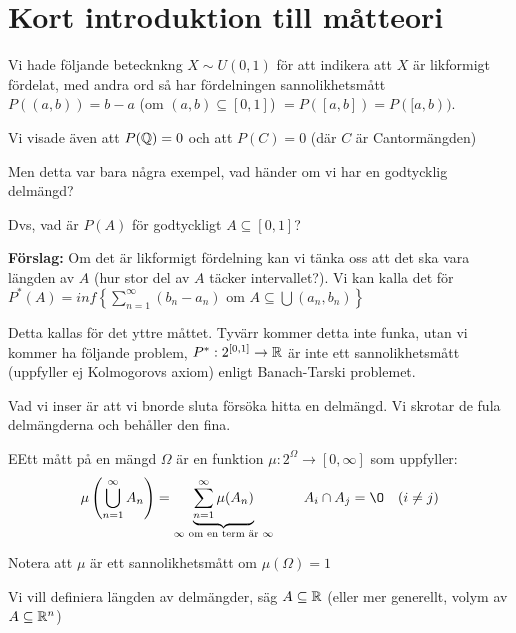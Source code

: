 \section{Kort introduktion till måtteori}\par
\noindent Vi hade följande betecknkng $X\sim U(0,1)$ för att indikera att $X$  är likformigt fördelat, med andra ord så har fördelningen sannolikhetsmått $P((a,b)) = b-a$ (om $(a,b)\subseteq [0,1]$) $= P([a,b]) = P([a,b))$.\par
\noindent Vi visade även att $P(\mathbb{Q})=0$ och att $P(C)=0$ (där $C$ är Cantormängden)
\par\bigskip
\noindent Men detta var bara några exempel, vad händer om vi har en godtycklig delmängd?\par
\noindent Dvs, vad är $P(A)$ för godtyckligt $A\subseteq[0,1]$?
\par\bigskip
\noindent\textbf{Förslag:} Om det är likformigt fördelning kan vi tänka oss att det ska vara längden av $A$ (hur stor del av $A$ täcker intervallet?). Vi kan kalla det för $P^*(A) = inf\left\{\sum_{n=1}^{\infty}(b_n-a_n)\text{ om } A\subseteq\bigcup(a_n,b_n)\right\}$\par
\noindent Detta kallas för det yttre måttet. Tyvärr kommer detta inte funka, utan vi kommer ha följande problem, $P^*:2^{[0,1]}\to\mathbb{R}$ är inte ett sannolikhetsmått (uppfyller ej Kolmogorovs axiom) enligt Banach-Tarski problemet.
\par\bigskip
\noindent Vad vi inser är att vi bnorde sluta försöka hitta en delmängd. Vi skrotar de fula delmängderna och behåller den fina.
\par\bigskip
\begin{theo}
 EEtt mått på en mängd $\Omega$ är en funktion $\mu:2^{\Omega}\to[0,\infty]$ som uppfyller:
  \begin{equation*}
    \begin{gathered}
      \mu\left(\bigcup_{n=1}^{\infty}A_n\right) = \underbrace{\sum_{n=1}^{\infty}\mu(A_n)}_{\text{$\infty$ om en term är $\infty$}}\qquad A_i\cap A_j=\O \quad (i\neq j)
    \end{gathered}
  \end{equation*}
  \par\bigskip
  \noindent Notera att $\mu$ är ett sannolikhetsmått om $\mu(\Omega) = 1$
\end{theo}
\par\bigskip
\noindent Vi vill definiera längden av delmängder, säg $A\subseteq\mathbb{R}$ (eller mer generellt, volym av $A\subseteq\mathbb{R}^n$)
\par\bigskip
